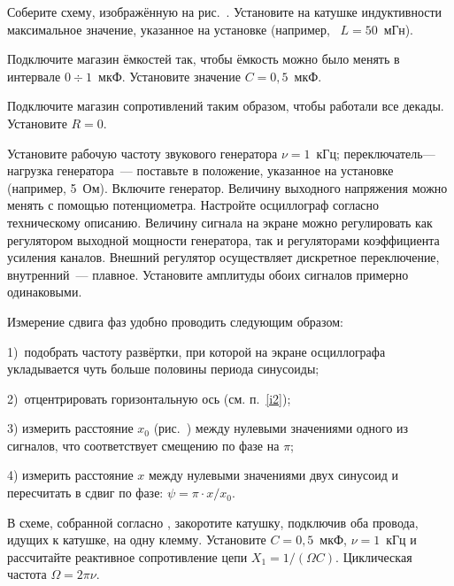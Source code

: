 \begin{lab:task}



	\item Соберите схему, изображённую на рис.~. Установите на
катушке индуктивности максимальное значение, указанное на установке (например,
~$L=50$~мГн).

	Подключите магазин ёмкостей так, чтобы ёмкость можно было менять в интервале
$0\div1$~мкФ. Установите значение $C=0,5$~мкФ.

	Подключите магазин сопротивлений таким образом, чтобы работали все декады.
Установите $R=0$.

	Установите рабочую частоту звукового генератора $\nu=1$~кГц;
переключатель--- нагрузка
	генератора~--- поставьте в положение, указанное на установке (например,
5~Ом). Включите генератор. Величину выходного напряжения можно менять с помощью
потенциометра.
	Настройте осциллограф согласно техническому описанию.
	Величину сигнала на экране можно регулировать как регулятором выходной
мощности генератора, так и регуляторами
	коэффициента усиления каналов. Внешний регулятор осуществляет дискретное
переключение, внутренний~--- плавное.
	Установите амплитуды обоих сигналов примерно одинаковыми.

	\item \label{i2} Измерение сдвига фаз удобно проводить следующим образом:

	1)~подобрать частоту развёртки, при которой на экране осциллографа
укладывается чуть больше половины периода синусоиды;

	2)~отцентрировать горизонтальную ось (см. п.~\ref{i2});

	3) измерить расстояние $x_0$ (рис.~) между нулевыми значениями
одного из сигналов, что соответствует смещению по
	фазе на $\pi$;

	4) измерить расстояние $x$ между нулевыми значениями двух синусоид и
пересчитать в сдвиг по фазе: $\psi=\pi\cdot x/x_0$.


	\item В схеме, собранной согласно , закоротите катушку,
подключив оба провода, идущих к катушке, на одну клемму.
	Установите $C=0,5$~мкФ, $\nu=1$~кГц и рассчитайте реактивное сопротивление
цепи $X_1=1/(\Omega C)$. Циклическая частота
	$\Omega=2\pi\nu$.


\end{lab:task}
